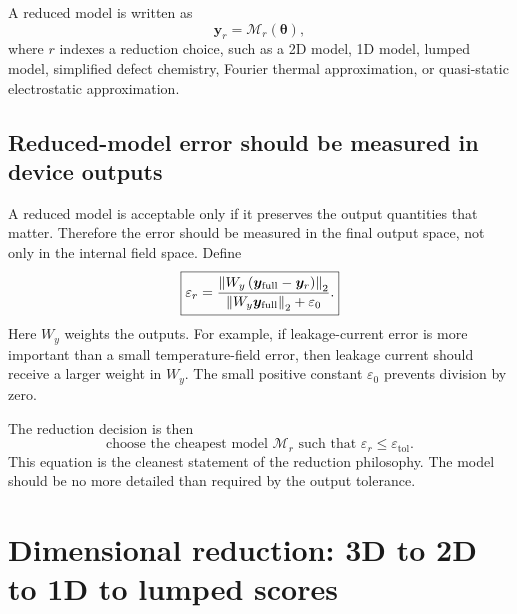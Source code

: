 \documentclass[11pt]{article}
\begin{document}
A reduced model is written as
\begin{equation}
    \bm{y}_{r}
    =
    \mathcal{M}_{r}(\bm{\theta}),
    \label{eq:reduced_model_operator}
\end{equation}
where \(r\) indexes a reduction choice, such as a 2D model, 1D model, lumped model, simplified defect chemistry, Fourier thermal approximation, or quasi-static electrostatic approximation.

\subsection{Reduced-model error should be measured in device outputs}
A reduced model is acceptable only if it preserves the output quantities that matter. Therefore the error should be measured in the final output space, not only in the internal field space. Define
\begin{equation}
    \boxed{
    \varepsilon_r
    =
    \frac{\norm{W_y\left(\bm{y}_{\mathrm{full}}-\bm{y}_r\right)}_2}
    {\norm{W_y\bm{y}_{\mathrm{full}}}_2+\varepsilon_0}
    .}
    \label{eq:rom_error}
\end{equation}
Here \(W_y\) weights the outputs. For example, if leakage-current error is more important than a small temperature-field error, then leakage current should receive a larger weight in \(W_y\). The small positive constant \(\varepsilon_0\) prevents division by zero.

The reduction decision is then
\begin{equation}
    \boxed{
    \text{choose the cheapest model } \mathcal{M}_r
    \text{ such that }
    \varepsilon_r \leq \varepsilon_{\mathrm{tol}}.
    }
    \label{eq:cheapest_model_constraint}
\end{equation}
This equation is the cleanest statement of the reduction philosophy. The model should be no more detailed than required by the output tolerance.

\section{Dimensional reduction: 3D to 2D to 1D to lumped scores}
\end{document}
